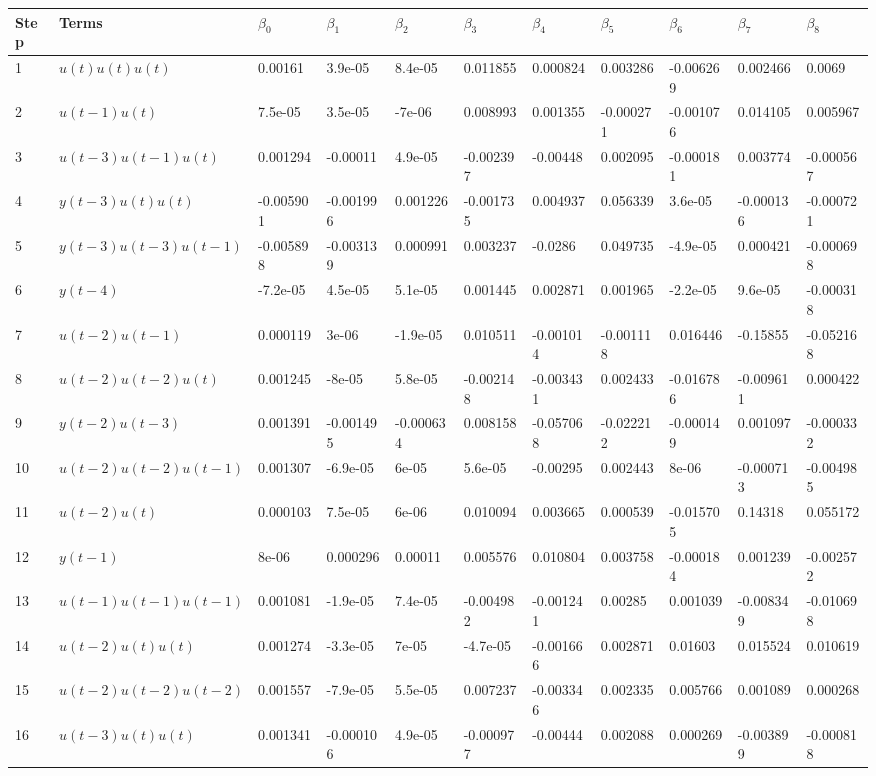 \begin{tabular}{lllllllllll}
Step & Terms & $\beta_{0}$ & $\beta_{1}$ & $\beta_{2}$ & $\beta_{3}$ & $\beta_{4}$ & $\beta_{5}$ & $\beta_{6}$ & $\beta_{7}$ & $\beta_{8}$ \\ 
\hline 
1 & $u(t)u(t)u(t)$ & 0.00161 & 3.9e-05 & 8.4e-05 & 0.011855 & 0.000824 & 0.003286 & -0.006269 & 0.002466 & 0.0069 \\ 
2 & $u(t-1)u(t)$ & 7.5e-05 & 3.5e-05 & -7e-06 & 0.008993 & 0.001355 & -0.000271 & -0.001076 & 0.014105 & 0.005967 \\ 
3 & $u(t-3)u(t-1)u(t)$ & 0.001294 & -0.00011 & 4.9e-05 & -0.002397 & -0.00448 & 0.002095 & -0.000181 & 0.003774 & -0.000567 \\ 
4 & $y(t-3)u(t)u(t)$ & -0.005901 & -0.001996 & 0.001226 & -0.001735 & 0.004937 & 0.056339 & 3.6e-05 & -0.000136 & -0.000721 \\ 
5 & $y(t-3)u(t-3)u(t-1)$ & -0.005898 & -0.003139 & 0.000991 & 0.003237 & -0.0286 & 0.049735 & -4.9e-05 & 0.000421 & -0.000698 \\ 
6 & $y(t-4)$ & -7.2e-05 & 4.5e-05 & 5.1e-05 & 0.001445 & 0.002871 & 0.001965 & -2.2e-05 & 9.6e-05 & -0.000318 \\ 
7 & $u(t-2)u(t-1)$ & 0.000119 & 3e-06 & -1.9e-05 & 0.010511 & -0.001014 & -0.001118 & 0.016446 & -0.15855 & -0.052168 \\ 
8 & $u(t-2)u(t-2)u(t)$ & 0.001245 & -8e-05 & 5.8e-05 & -0.002148 & -0.003431 & 0.002433 & -0.016786 & -0.009611 & 0.000422 \\ 
9 & $y(t-2)u(t-3)$ & 0.001391 & -0.001495 & -0.000634 & 0.008158 & -0.057068 & -0.022212 & -0.000149 & 0.001097 & -0.000332 \\ 
10 & $u(t-2)u(t-2)u(t-1)$ & 0.001307 & -6.9e-05 & 6e-05 & 5.6e-05 & -0.00295 & 0.002443 & 8e-06 & -0.000713 & -0.004985 \\ 
11 & $u(t-2)u(t)$ & 0.000103 & 7.5e-05 & 6e-06 & 0.010094 & 0.003665 & 0.000539 & -0.015705 & 0.14318 & 0.055172 \\ 
12 & $y(t-1)$ & 8e-06 & 0.000296 & 0.00011 & 0.005576 & 0.010804 & 0.003758 & -0.000184 & 0.001239 & -0.002572 \\ 
13 & $u(t-1)u(t-1)u(t-1)$ & 0.001081 & -1.9e-05 & 7.4e-05 & -0.004982 & -0.001241 & 0.00285 & 0.001039 & -0.008349 & -0.010698 \\ 
14 & $u(t-2)u(t)u(t)$ & 0.001274 & -3.3e-05 & 7e-05 & -4.7e-05 & -0.001666 & 0.002871 & 0.01603 & 0.015524 & 0.010619 \\ 
15 & $u(t-2)u(t-2)u(t-2)$ & 0.001557 & -7.9e-05 & 5.5e-05 & 0.007237 & -0.003346 & 0.002335 & 0.005766 & 0.001089 & 0.000268 \\ 
16 & $u(t-3)u(t)u(t)$ & 0.001341 & -0.000106 & 4.9e-05 & -0.000977 & -0.00444 & 0.002088 & 0.000269 & -0.003899 & -0.000818 \\ 
\hline 
\end{tabular}